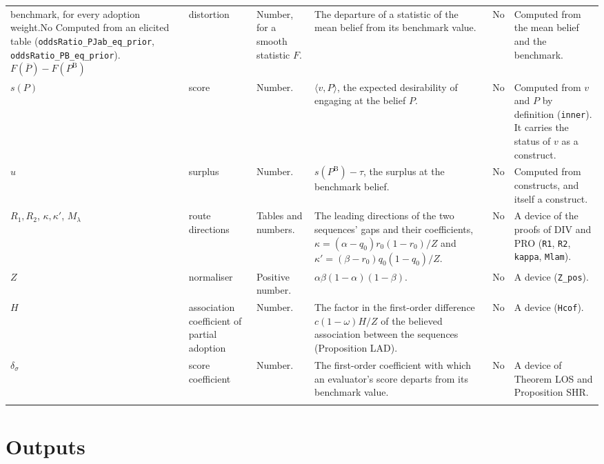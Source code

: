\documentclass[11pt]{article}
\newcommand{\PB}{P^{\mathrm{B}}}
\newcommand{\Pbar}{\overline{P}}
\newcommand{\lean}[1]{\texttt{\scriptsize #1}}
\newcommand{\mm}[6]{#1 & #2 & #3 & #4 & #5 & #6 \\ \addlinespace}
\begin{document}
\begin{longtable}{@{}P{1.6cm}P{1.9cm}P{1.8cm}P{4.1cm}P{1.2cm}P{4.1cm}@{}}
{  benchmark, for every adoption weight.}{No}
  {Computed from an elicited table (\lean{oddsRatio\_PJab\_eq\_prior},
  \lean{oddsRatio\_PB\_eq\_prior}).}
\mm{$F(\Pbar)-F(\PB)$}{distortion}{Number, for a smooth statistic $F$.}
  {The departure of a statistic of the mean belief from its benchmark
  value.}{No}
  {Computed from the mean belief and the benchmark.}
\mm{$s(P)$}{score}{Number.}
  {$\langle v,P\rangle$, the expected desirability of engaging at the belief
  $P$.}{No}
  {Computed from $v$ and $P$ by definition (\lean{inner}). It carries the
  status of $v$ as a construct.}
\mm{$u$}{surplus}{Number.}
  {$s(\PB)-\tau$, the surplus at the benchmark belief.}{No}
  {Computed from constructs, and itself a construct.}
\mm{$R_1,R_2$, $\kappa,\kappa'$, $M_\lambda$}{route directions}{Tables and
  numbers.}
  {The leading directions of the two sequences' gaps and their coefficients,
  $\kappa=(\alpha-q_0)r_0(1-r_0)/Z$ and $\kappa'=(\beta-r_0)q_0(1-q_0)/Z$.}{No}
  {A device of the proofs of DIV and PRO (\lean{R1}, \lean{R2},
  \lean{kappa}, \lean{Mlam}).}
\mm{$Z$}{normaliser}{Positive number.}
  {$\alpha\beta(1-\alpha)(1-\beta)$.}{No}
  {A device (\lean{Z\_pos}).}
\mm{$H$}{association coefficient of partial adoption}{Number.}
  {The factor in the first-order difference $c(1-\omega)H/Z$ of the believed
  association between the sequences (Proposition LAD).}{No}
  {A device (\lean{Hcof}).}
\mm{$\delta_\sigma$}{score coefficient}{Number.}
  {The first-order coefficient with which an evaluator's score departs from its
  benchmark value.}{No}
  {A device of Theorem LOS and Proposition SHR.}
\end{longtable}
\normalsize

\section*{Outputs}
\end{document}
